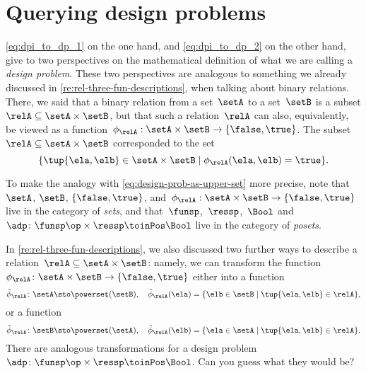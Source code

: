 
\section{Querying design problems}
\label{sec:dp-querying}



\cref{eq:dpi_to_dp_1} on the one hand, and \cref{eq:dpi_to_dp_2} on the other hand, give to two perspectives on the mathematical definition of what we are calling a \emph{design problem}.
These two perspectives are analogous to something we already discussed in \cref{re:rel-three-fun-descriptions}, when talking about binary relations.
There, we said that a binary relation from a set~$\setA$ to a set~$\setB$ is a subset $\relA \subseteq \setA \times \setB$,
but that such a relation~$\relA$ can also, equivalently, be viewed as a function~$\phi_{\relA}: \setA \times \setB \to \{ \false, \true \}$.
The subset~$\relA \subseteq \setA \times \setB$ corresponded to the set
\begin{equation}
\{ \tup{\ela, \elb} \in \setA \times \setB \mid \phi_{\relA}(\ela, \elb) = \true \}.
\end{equation}

To make the analogy with \cref{eq:design-prob-as-upper-set} more precise, note that~$\setA$, $\setB$, $\{ \false, \true \}$,
and~$\phi_{\relA}: \setA \times \setB \to \{ \false, \true \}$ live in the category of \emph{sets},
and that~$\funsp$,~$\ressp$,~$\Bool$ and~$\adp\colon \funsp\op \times \ressp\toinPos \Bool$ live in the category of \emph{posets}.

In \cref{re:rel-three-fun-descriptions}, we also discussed two further ways to describe a relation~$\relA \subseteq \setA \times \setB$:
namely, we can transform the function~$\phi_{\relA}\colon \setA \times \setB \to \{ \false, \true \}$ either into a function
\begin{equation}\label{eq:curried-relation-again}
\hat \phi_{\relA} \colon \setA \sto \powerset (\setB), \quad \hat \phi_{\relA} (\ela) = \{ \elb \in \setB \mid \tup{\ela, \elb} \in \relA \},
\end{equation}
or a function 
\begin{equation}\label{eq:co-curried-relation-again}
\check \phi_{\relA} \colon \setB \sto \powerset (\setA), \quad \check \phi_{\relA} (\elb) = \{ \ela \in \setA \mid \tup{\ela, \elb} \in \relA \}.
\end{equation}
There are analogous transformations for a design problem~$\adp\colon \funsp\op \times \ressp\toinPos \Bool$. Can you guess what they would be?

